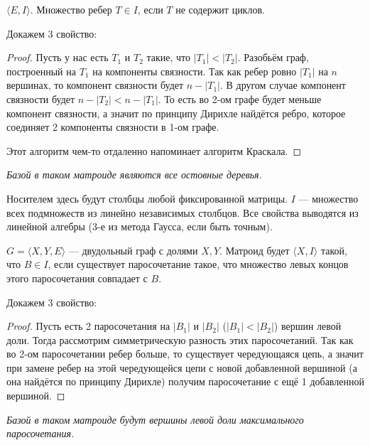 \documentclass[a4paper, 12pt]{article}
\begin{document}
\begin{Examples}
  $\langle E, I \rangle$. Множество ребер $T \in I$, если $T$ не содержит циклов.

\rm{Докажем 3 свойство:
  \begin{proof}
  Пусть у нас есть $T_1$ и $T_2$ такие, что $|T_1| < |T_2|$. 
  Разобьём граф, построенный на $T_1$ на компоненты 
  связности. Так как ребер ровно $|T_1|$ на $n$ вершинах, то компонент связности
  будет
  $n - |T_1|$. В другом случае компонент связности будет $n - |T_2| < n - |T_1|$. 
  То есть во 2-ом графе будет меньше компонент связности, а значит по принципу
  Дирихле найдётся ребро, которое соединяет 2 компоненты связности в 1-ом графе.

  Этот алгоритм чем-то отдаленно напоминает алгоритм Краскала.
  \end{proof}}

  \textit{Базой в таком матроиде являются все остовные деревья.}
\end{Examples}

\begin{Examples}
  Носителем здесь будут столбцы любой фиксированной матрицы. 
  $I$ --- множество всех подмножеств из линейно независимых 
  столбцов. Все свойства выводятся из линейной алгебры (3-е из метода Гаусса, 
  если быть точным).
\end{Examples}

\begin{Examples}
  $G = \langle X, Y, E \rangle$ --- двудольный граф с долями $X, Y$. Матроид
  будет $\langle X, I \rangle$ такой, что $B \in I$, если существует паросочетание
  такое, что множество левых концов этого паросочетания совпадает с $B$.

  \rm{Докажем 3 свойство:
  \begin{proof}
    Пусть есть 2 паросочетания на $|B_1|$ и $|B_2|$ ($|B_1| < |B_2|$) вершин
    левой доли. Тогда рассмотрим симметрическую разность этих паросочетаний.
    Так как во 2-ом паросочетании ребер больше, то существует чередующаяся
    цепь, а значит при замене ребер на этой чередующейся 
    цепи с новой добавленной вершиной (а она найдётся по 
    принципу Дирихле) получим паросочетание с ещё 1 добавленной вершиной.
  \end{proof}
  }

  \textit{Базой в таком матроиде будут вершины левой доли максимального паросочетания.}
\end{Examples}
\end{document}
